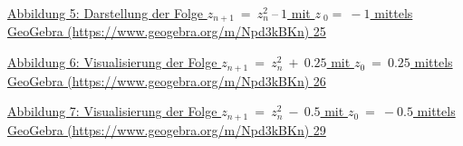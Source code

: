 \documentclass[a4paper, 12pt]{book}
\begin{document}
\protect\hyperlink{_Toc167901655}{Abbildung 5: Darstellung der Folge
\(z_{n + 1}\  = \ z_{n}^{2}\ –\ 1\) mit \({z\ }_{0} = \  - 1\) mittels
GeoGebra (https://www.geogebra.org/m/Npd3kBKn)
\protect\hyperlink{_Toc167901655}{25}}

\protect\hyperlink{_Toc167901656}{Abbildung 6: Visualisierung der Folge
\(z_{n + 1}\  = \ z_{n}^{2}\  + \ 0.25\) mit \(z_{0}\  = \ 0.25\)
mittels GeoGebra (https://www.geogebra.org/m/Npd3kBKn)
\protect\hyperlink{_Toc167901656}{26}}

\protect\hyperlink{_Toc167901657}{Abbildung 7: Visualisierung der Folge
\(z_{n + 1}\  = \ z_{n}^{2}\  - \ 0.5\) mit \(z_{0}\  = \  - 0.5\)
mittels GeoGebra (https://www.geogebra.org/m/Npd3kBKn)
\protect\hyperlink{_Toc167901657}{29}}
\end{document}
